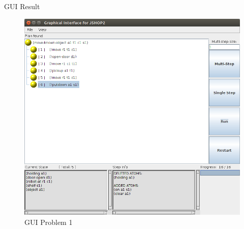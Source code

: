 \documentclass{beamer}
\begin{document}


%

\begin{frame}{GUI Result}
  \begin{figure}[h!]
    \centering
    \includegraphics[width=0.65\linewidth]{images/problem1_gui}
    \caption{GUI Problem 1}
    \label{fig:probem1_gui}
  \end{figure}
\end{frame}
\end{document}
